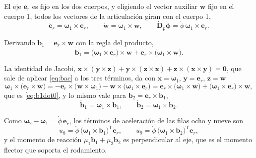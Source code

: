 \documentclass[11pt]{article}
\newcommand{\T}{^{\mathrm{T}}}
\newcommand{\wv}{\boldsymbol{\omega}}
\begin{document}
El eje $\mathbf{e}_r$ es fijo en los dos cuerpos, y eligiendo el vector auxiliar $\mathbf{w}$ fijo en el cuerpo 1, todos los vectores de la articulación giran con el cuerpo 1,
\begin{equation}
\dot{\mathbf{e}}_r=\wv_1\times\mathbf{e}_r,
\qquad
\dot{\mathbf{w}}=\wv_1\times\mathbf{w},
\qquad
\dot{\mathbf{D}}_p\dot{\boldsymbol{\phi}}=\dot\phi\,\wv_1\times\mathbf{e}_r .
\label{eq:Ddotr}
\end{equation}

Derivando $\mathbf{b}_1=\mathbf{e}_r\times\mathbf{w}$ con la regla del producto,
\begin{equation}
\dot{\mathbf{b}}_1=\big(\wv_1\times\mathbf{e}_r\big)\times\mathbf{w}+\mathbf{e}_r\times\big(\wv_1\times\mathbf{w}\big).
\label{eq:b1dot0}
\end{equation}

La identidad de Jacobi, $\mathbf{x}\times(\mathbf{y}\times\mathbf{z})+\mathbf{y}\times(\mathbf{z}\times\mathbf{x})+\mathbf{z}\times(\mathbf{x}\times\mathbf{y})=\mathbf{0}$, que sale de aplicar \eqref{eq:bac} a los tres términos, da con $\mathbf{x}=\wv_1$, $\mathbf{y}=\mathbf{e}_r$, $\mathbf{z}=\mathbf{w}$
\begin{equation}
\wv_1\times\big(\mathbf{e}_r\times\mathbf{w}\big)
=-\mathbf{e}_r\times\big(\mathbf{w}\times\wv_1\big)-\mathbf{w}\times\big(\wv_1\times\mathbf{e}_r\big)
=\mathbf{e}_r\times\big(\wv_1\times\mathbf{w}\big)+\big(\wv_1\times\mathbf{e}_r\big)\times\mathbf{w},
\label{eq:jacobi}
\end{equation}
que es \eqref{eq:b1dot0}, y lo mismo vale para $\mathbf{b}_2=\mathbf{e}_r\times\mathbf{b}_1$,
\begin{equation}
\dot{\mathbf{b}}_1=\wv_1\times\mathbf{b}_1,
\qquad
\dot{\mathbf{b}}_2=\wv_1\times\mathbf{b}_2 .
\label{eq:bdotr}
\end{equation}

Como $\wv_2-\wv_1=\dot\phi\,\mathbf{e}_r$, los términos de aceleración de las filas ocho y nueve son
\begin{equation}
u_8=\dot\phi\,\big(\wv_1\times\mathbf{b}_1\big)\T\mathbf{e}_r,
\qquad
u_9=\dot\phi\,\big(\wv_1\times\mathbf{b}_2\big)\T\mathbf{e}_r ,
\label{eq:u89}
\end{equation}
y el momento de reacción $\mu_1\mathbf{b}_1+\mu_2\mathbf{b}_2$ es perpendicular al eje, que es el momento flector que soporta el rodamiento.
\end{document}
